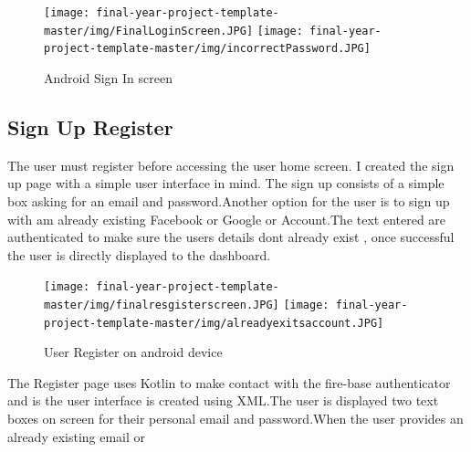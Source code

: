    \begin{figure}[H]
  \centering
    \texttt{[image: final-year-project-template-master/img/FinalLoginScreen.JPG]}
        \texttt{[image: final-year-project-template-master/img/incorrectPassword.JPG]}

     \caption{Android Sign In screen }
\end{figure}


\subsection{Sign Up Register}
The user must register before accessing the user home screen.
I created the sign up page with a simple user interface in mind.
The sign up consists of a simple box asking for an email and password.Another option for the user is to sign up with am already existing Facebook or Google or Account.The text entered are authenticated to make sure the users details dont already exist , once successful the  user is directly displayed to the dashboard.


\begin{figure}[H]
  \centering
    \texttt{[image: final-year-project-template-master/img/finalresgisterscreen.JPG]}
        \texttt{[image: final-year-project-template-master/img/alreadyexitsaccount.JPG]}

     \caption{User Register on android device}
\end{figure}


The Register page uses Kotlin to make contact with the fire-base authenticator and is the user interface is created using XML.The user is displayed two text boxes on screen for their personal email and password.When the user provides an already existing email or 

